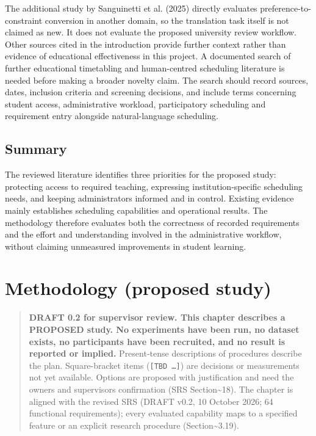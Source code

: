 \documentclass[
  11pt,a4paper,oneside]{report}
\begin{document}
The additional study by Sanguinetti et al. (2025) directly evaluates preference-to-constraint conversion in another domain, so the translation task itself is not claimed as new. It does not evaluate the proposed university review workflow. Other sources cited in the introduction provide further context rather than evidence of educational effectiveness in this project. A documented search of further educational timetabling and human-centred scheduling literature is needed before making a broader novelty claim. The search should record sources, dates, inclusion criteria and screening decisions, and include terms concerning student access, administrative workload, participatory scheduling and requirement entry alongside natural-language scheduling.

\section{Summary}
The reviewed literature identifies three priorities for the proposed study: protecting access to required teaching, expressing institution-specific scheduling needs, and keeping administrators informed and in control. Existing evidence mainly establishes scheduling capabilities and operational results. The methodology therefore evaluates both the correctness of recorded requirements and the effort and understanding involved in the administrative workflow, without claiming unmeasured improvements in student learning.

\hypertarget{methodology-proposed-study}{%
\chapter{Methodology (proposed
study)}\label{methodology-proposed-study}}

\begin{quote}
\textbf{DRAFT 0.2 for supervisor review. This chapter describes a
PROPOSED study. No experiments have been run, no dataset exists, no
participants have been recruited, and no result is reported or implied.}
Present-tense descriptions of procedures describe the plan.
Square-bracket items (\texttt{{[}TBD\ …{]}}) are decisions or
measurements not yet available. Options are proposed with justification
and need the owner\textquotesingle s and supervisor\textquotesingle s
confirmation (SRS Section\textasciitilde18). The chapter is aligned with
the revised SRS (DRAFT v0.2, 10 October 2026; 64 functional requirements); every evaluated capability maps to a specified
feature or an explicit research procedure (Section\textasciitilde3.19).
\end{quote}
\end{document}
